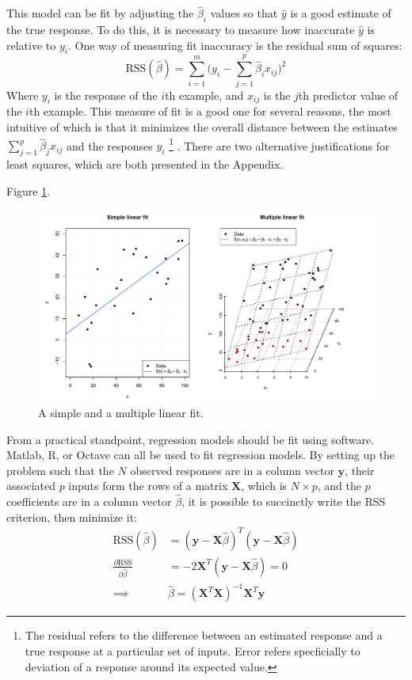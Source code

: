 \documentclass[11pt,a4paper,article]{memoir} %
\begin{document}
This model can be fit by adjusting the $\hat{\beta}_i$ values so that $\hat{y}$ is a good estimate of the true response. To do this, it is necessary to measure how inaccurate $\hat{y}$ is relative to $y_i$. One way of measuring fit inaccuracy is the residual sum of squares:
\begin{equation}
	\text{RSS}(\hat{\beta}) = \sum_{i = 1}^m \Big(y_i - \sum_{j = 1}^p \hat{\beta}_i x_{ij})^2
	\label{eq:rss}
\end{equation}
Where $y_i$ is the response of the $i$th example, and $x_{ij}$ is the $j$th predictor value of the $i$th example. This measure of fit is a good one for several reasons, the most intuitive of which is that it minimizes the overall distance between the estimates $\sum_{j = 1}^p \hat{\beta}_j x_{ij}$ and the responses $y_i$ \footnote{The residual refers to the difference between an estimated response and a true response at a particular set of inputs. Error refers specficially to deviation of a response around its expected value.} . There are two alternative justifications for least squares, which are both presented in the Appendix.

 Figure \ref{fig:linear_regression}. 
\begin{figure}
\includegraphics[width=\textwidth]{linear_fits.pdf}
\caption{A simple and a multiple linear fit.}
\label{fig:linear_regression}
\end{figure}

From a practical standpoint, regression models should be fit using software. Matlab, R, or Octave can all be used to fit regression models. By setting up the problem such that the $N$ observed responses are in a column vector $\mathbf{y}$, their associated $p$ inputs form the rows of a matrix $\mathbf{X}$, which is $N \times p$, and the $p$ coefficients are in a column vector $\hat{\beta}$, it is possible to succinctly write the RSS criterion, then minimize it:
\begin{align}
	\text{RSS}(\hat{\beta}) &= (\mathbf{y - X}\hat{\beta})^T(\mathbf{y - X}\hat{\beta}) \\
	\frac{\partial \text{RSS}}{\partial \hat{\beta}} &= -2\mathbf{X}^T(\mathbf{y - X}\hat{\beta}) = 0 \\
	\implies &\hat{\beta} = (\mathbf{X}^T\mathbf{X})^{-1}\mathbf{X}^T \mathbf{y} \label{eq:normal_eqtn}
\end{align}
\end{document}
